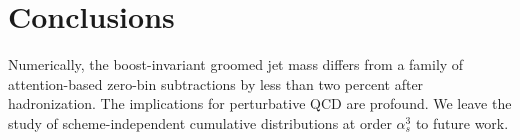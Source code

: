 \section{Conclusions}\label{sec:conclusions}

Numerically, the boost-invariant groomed jet mass differs from a family
of attention-based zero-bin subtractions by less than two percent after
hadronization. The implications for perturbative QCD are profound. We
leave the study of scheme-independent cumulative distributions at order
$\alpha_s^3$ to future work.

